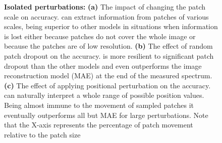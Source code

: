 \begin{figure}[t]
\begin{subfigure}[b]{0.32\textwidth}
\begin{center}
\begin{small}
\begin{sc}
\begin{center}
\end{center}
\end{sc}
\end{small}
\end{center}
\afterplot
\caption{}
\label{fig:shake-sample}
\end{subfigure}
\afterplot
\caption{\textbf{Isolated perturbations:} \textbf{(a)} The impact of changing the patch scale on accuracy. \ours{} can extract information from patches of various scales, being superior to other models in situations when information is lost either because patches do not cover the whole image or because the patches are of low resolution. \textbf{(b)} The effect of random patch dropout on the accuracy. \ours{} is more resilient to significant patch dropout than the other models and even outperforms the image reconstruction model (MAE) at the end of the measured spectrum. \textbf{(c)} The effect of applying positional perturbation on the accuracy. \ours{} can naturally interpret a whole range of possible position values. Being almost immune to the movement of sampled patches it eventually outperforms all but MAE for large perturbations. Note that the X-axis represents the percentage of patch movement relative to the patch size}
\end{figure}